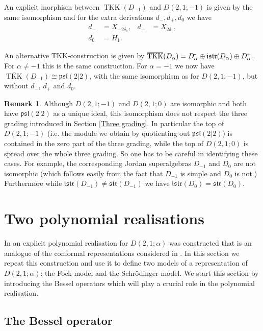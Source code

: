 \documentclass{amsart}
\numberwithin{theorem}{section}
\theoremstyle{definition}
\newtheorem{Remark}[theorem]{Remark}
\theoremstyle{remark}
\DeclareMathOperator{\TKK}{TKK}
\newcommand{\mf}[1]{\mathfrak{#1}}
\newcommand{\minus}{\scalebox{0.9}{{\rm -}}}
\newcommand{\plus}{\scalebox{0.6}{{\rm+}}}
\begin{document}
An explicit morphism between $\TKK(D_{-1})$ and $D(2,1;-1)$ is given by the same isomorphism and for the extra derivations $d_-, d_+, d_0$ we have
\begin{align*}
d_- &= X_{-2\delta_1}, & d_+ &= X_{2\delta_1},\\
d_0 &= H_1.
\end{align*}

An alternative TKK-construction is given by $\overline{\TKK}(D_\alpha)= D_\alpha^{\minus} \oplus \mathfrak{istr} (D_\alpha) \oplus D_\alpha^{\plus}$. For $\alpha \neq-1$ this is the same construction. For $\alpha=-1$ we now have $\overline{\TKK}(D_{-1}) \cong \mathfrak{psl}(2|2)$, with the same isomorphism as for $D(2,1;-1)$, but without $d_-$, $d_+$ and $d_0$. 

\begin{Remark}
Although $D(2,1;-1)$ and $D(2,1;0)$ are isomorphic and both have $\mathfrak{psl}(2|2)$ as a unique ideal, this isomorphism does not respect the three grading introduced in Section \ref{Three grading}.  In particular the top  of $D(2,1;-1)$ (i.e. the module  we obtain by quotienting out $\mathfrak{psl}(2|2)$) is contained in the zero part of the three grading, while the top of $D(2,1;0)$ is spread over the whole three grading. So one has to be careful in identifying these cases. For example, the corresponding Jordan superalgebras $D_{-1}$ and $D_{0}$ are not isomorphic (which follows easily from the fact that $D_{-1}$ is simple and $D_{0}$ is not.) Furthermore while $\mf{istr}(D_{-1})\not= \mf{str} (D_{-1})$ we have $\mf{istr}(D_{0})= \mf{str} (D_{0})$.     
\end{Remark}

\section{Two polynomial realisations}
\label{Section polynomial realisations}
In \cite{BC1} an explicit polynomial realisation for $D(2,1;\alpha)$ was constructed that is an analogue of the conformal representations considered in \cite{HKM}. In this section we repeat this construction and use it to define two models of a representation of $D(2,1;\alpha)$: the Fock model and the Schr\"odinger model. We start this section by introducing the Bessel operators which will play a crucial role in the polynomial realisation.
 
\subsection{The Bessel operator}
\end{document}
